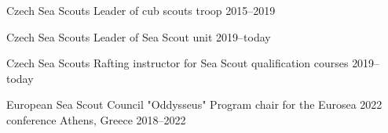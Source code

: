 



\begin{cvpubs}
\end{cvpubs}


\begin{cvhonors}
  \cvhonor
    {Czech Sea Scouts} %
    {Leader of cub scouts troop} %
    {} %
    {2015--2019} %
    
  \cvhonor
    {Czech Sea Scouts} %
    {Leader of Sea Scout unit} %
    {} %
    {2019--today} %

  \cvhonor
    {Czech Sea Scouts} %
    {Rafting instructor for Sea Scout qualification courses} %
    {} %
    {2019--today} %

  \cvhonor
    {European Sea Scout Council "Oddysseus"} %
    {Program chair for the Eurosea 2022 conference} %
    {\hspace{-3em}Athens, Greece} %
    {2018--2022} %
    
\end{cvhonors}





